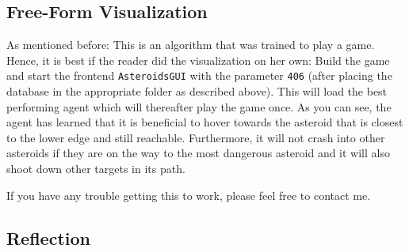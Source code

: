 \documentclass[a4paper,10pt]{article}
\begin{document}
\subsection{Free-Form Visualization}

As mentioned before: This is an algorithm that was trained to play a game.
Hence, it is best if the reader did the visualization on her own:
Build the game and start the frontend \texttt{AsteroidsGUI} with the parameter \texttt{406} (after placing the database in the appropriate folder as described above).
This will load the best performing agent which will thereafter play the game once.
As you can see, the agent has learned that it is beneficial to hover towards the asteroid that is closest to the lower edge and still reachable.
Furthermore, it will not crash into other asteroids if they are on the way to the most dangerous asteroid and it will also shoot down other targets in its path.

If you have any trouble getting this to work, please feel free to contact me.
\subsection{Reflection}
\end{document}
